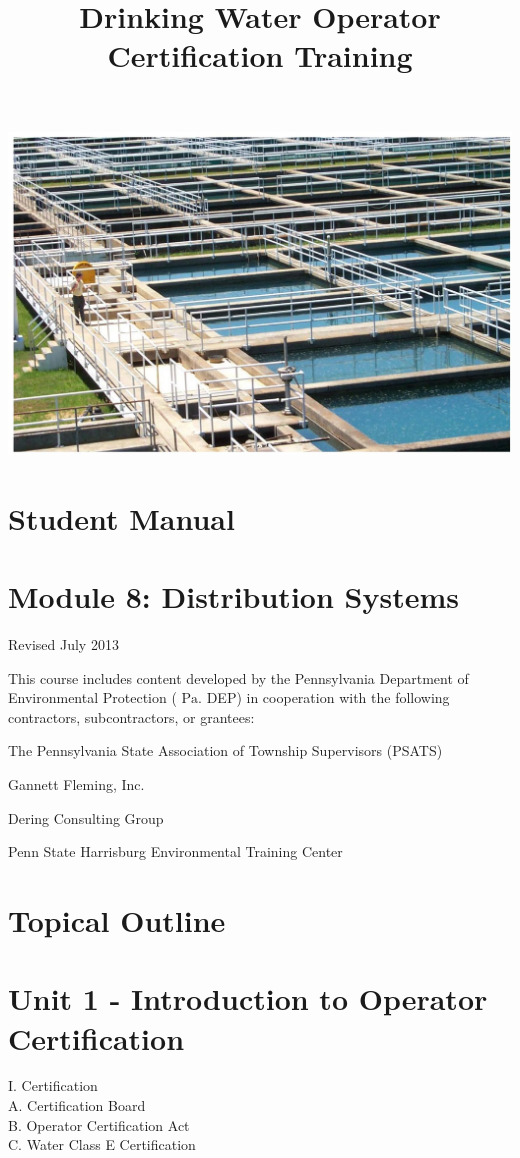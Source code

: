 \documentclass[10pt]{article}
\title{Drinking Water Operator Certification Training }
\author{}
\date{}
\begin{document}
\maketitle
\includegraphics[max width=\textwidth]{2022_10_30_098bb5f44c5986ff92a9g-01}

\section{Student Manual}
\section{Module 8: Distribution Systems}
Revised July 2013

This course includes content developed by the Pennsylvania Department of Environmental Protection ( $\mathrm{Pa}$. DEP) in cooperation with the following contractors, subcontractors, or grantees:

The Pennsylvania State Association of Township Supervisors (PSATS)

Gannett Fleming, Inc.

Dering Consulting Group

Penn State Harrisburg Environmental Training Center

\section{Topical Outline}
\section{Unit 1 - Introduction to Operator Certification}
I. Certification\\
A. Certification Board\\
B. Operator Certification Act\\
C. Water Class E Certification
\end{document}
